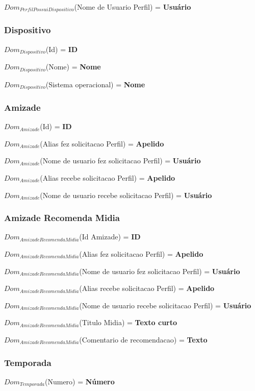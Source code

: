 \documentclass[12pt,a4paper]{article}
\newcommand{\createdomain}[3]{
    $Dom_{#1}$(#2) = {\bf #3}
}
\begin{document}
        \createdomain{Perfil Possui Dispositivo}{Nome de Usuario Perfil}{Usuário}


    \subsubsection{Dispositivo}
        \createdomain{Dispositivo}{Id}{ID}

        \createdomain{Dispositivo}{Nome}{Nome}

        \createdomain{Dispositivo}{Sistema operacional}{Nome}


    \subsubsection{Amizade}
        \createdomain{Amizade}{Id}{ID}

        \createdomain{Amizade}{Alias fez solicitacao Perfil}{Apelido}

        \createdomain{Amizade}{Nome de usuario fez solicitacao Perfil}{Usuário}

        \createdomain{Amizade}{Alias recebe solicitacao Perfil}{Apelido}

        \createdomain{Amizade}{Nome de usuario recebe solicitacao Perfil}{Usuário}


    \subsubsection{Amizade Recomenda Midia}
        \createdomain{Amizade Recomenda Midia}{Id Amizade}{ID}

        \createdomain{Amizade Recomenda Midia}{Alias fez solicitacao Perfil}{Apelido}

        \createdomain{Amizade Recomenda Midia}{Nome de usuario fez solicitacao Perfil}{Usuário}

        \createdomain{Amizade Recomenda Midia}{Alias recebe solicitacao Perfil}{Apelido}

        \createdomain{Amizade Recomenda Midia}{Nome de usuario recebe solicitacao Perfil}{Usuário}

        \createdomain{Amizade Recomenda Midia}{Titulo Midia}{Texto curto}

        \createdomain{Amizade Recomenda Midia}{Comentario de recomendacao}{Texto}


    \subsubsection{Temporada}
        \createdomain{Temporada}{Numero}{Número}
\end{document}
